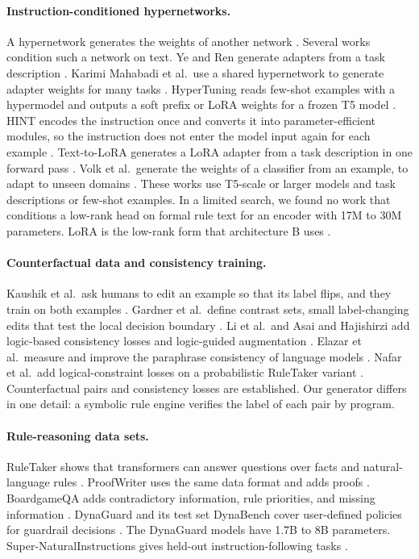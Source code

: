 \documentclass[11pt,a4paper]{article}
\begin{document}
\paragraph{Instruction-conditioned hypernetworks.}
A hypernetwork generates the weights of another network \cite{ha2016}.
Several works condition such a network on text.
Ye and Ren generate adapters from a task description \cite{ye2021}.
Karimi Mahabadi et al.\ use a shared hypernetwork to generate adapter weights for many tasks \cite{mahabadi2021}.
HyperTuning reads few-shot examples with a hypermodel and outputs a soft prefix or LoRA weights for a frozen T5 model \cite{phang2023}.
HINT encodes the instruction once and converts it into parameter-efficient modules, so the instruction does not enter the model input again for each example \cite{ivison2023}.
Text-to-LoRA generates a LoRA adapter from a task description in one forward pass \cite{charakorn2025}.
Volk et al.\ generate the weights of a classifier from an example, to adapt to unseen domains \cite{volk2023}.
These works use T5-scale or larger models and task descriptions or few-shot examples.
In a limited search, we found no work that conditions a low-rank head on formal rule text for an encoder with 17M to 30M parameters.
LoRA is the low-rank form that architecture B uses \cite{hu2021}.

\paragraph{Counterfactual data and consistency training.}
Kaushik et al.\ ask humans to edit an example so that its label flips, and they train on both examples \cite{kaushik2020}.
Gardner et al.\ define contrast sets, small label-changing edits that test the local decision boundary \cite{gardner2020}.
Li et al.\ and Asai and Hajishirzi add logic-based consistency losses and logic-guided augmentation \cite{li2019,asai2020}.
Elazar et al.\ measure and improve the paraphrase consistency of language models \cite{elazar2021}.
Nafar et al.\ add logical-constraint losses on a probabilistic RuleTaker variant \cite{nafar2024}.
Counterfactual pairs and consistency losses are established.
Our generator differs in one detail: a symbolic rule engine verifies the label of each pair by program.

\paragraph{Rule-reasoning data sets.}
RuleTaker shows that transformers can answer questions over facts and natural-language rules \cite{clark2020}.
ProofWriter uses the same data format and adds proofs \cite{tafjord2021}.
BoardgameQA adds contradictory information, rule priorities, and missing information \cite{kazemi2023}.
DynaGuard and its test set DynaBench cover user-defined policies for guardrail decisions \cite{hoover2025}.
The DynaGuard models have 1.7B to 8B parameters.
Super-NaturalInstructions gives held-out instruction-following tasks \cite{wang2022}.
\end{document}
